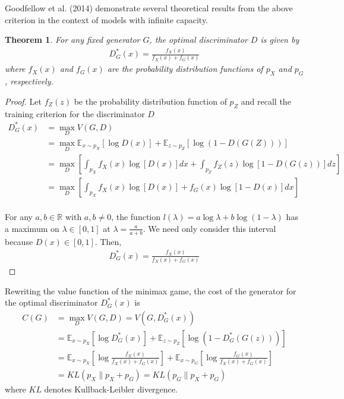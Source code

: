 \documentclass[submission]{eptcs}
\newcommand{\R}{\mathbb R}
\newtheorem{theorem}{Theorem}
\begin{document}
\noindent Goodfellow et al. (2014) demonstrate several theoretical results from the above criterion in the context of models with infinite capacity. \\

\begin{theorem}
    For any fixed generator $G$, the optimal discriminator $D$ is given by
    \begin{align}
        D^*_G(x) = \frac{f_X(x)}{f_X(x) + f_G(x)}
    \end{align}
    where $f_X(x)$ and $f_G(x)$ are the probability distribution functions of $p_X$ and $p_G$, respectively.
\end{theorem}
\begin{proof}
    Let $f_Z(z)$ be the probability distribution function of $p_Z$ and recall the training criterion for the discriminator $D$
    \begin{align*}
        D^*_G(x) &= \max_D V(G, D) \\
        &= \max_D \mathbb{E}_{x \sim p_X} [\log D(x)] + \mathbb{E}_{z \sim p_Z} [\log(1 - D(G(Z)))] \\
        &= \max_D \left [ \int_{p_X} f_X(x) \log [D(x)] dx + \int_{p_Z} f_Z(z) \log [1-D(G(z))]dz \right ] \\
        &= \max_D \left [ \int_{p_X} f_X(x) \log [D(x)] + f_G(x) \log [1-D(x)] dx \right ] \\
    \end{align*}

    \noindent For any $a, b \in \R$ with $a, b \neq 0$, the function $l(\lambda) = a \log \lambda + b \log (1 - \lambda)$ has a maximum on $\lambda \in [0, 1]$ at $\lambda = \frac{a}{a+b}$. We need only consider this interval because $D(x) \in [0, 1]$. Then, 
    \begin{align*}
        D^*_G(x) = \frac{f_X(x)}{f_X(x) + f_G(x)}
    \end{align*}    
\end{proof}

\noindent Rewriting the value function of the minimax game, the cost of the generator for the optimal discriminator $D^*_G(x)$ is
\begin{align*}
    C(G) &= \max_D V(G, D) = V(G, D^*_G(x)) \\
    &= \mathbb{E}_{x \sim p_X} [\log D^*_G(x)] + \mathbb{E}_{z \sim p_Z} [\log(1 - D^*_G(G(z)))] \\
    &= \mathbb{E}_{x \sim p_X} \left [\log \frac{f_X(x)}{f_X(x) + f_G(x)} \right ] + \mathbb{E}_{x \sim p_G} \left [ \log \frac{f_G(x)}{f_X(x) + f_G(x)} \right ] \\
    &= KL (p_X \| p_X + p_G) = KL (p_G \| p_X + p_G)
\end{align*}
where $KL$ denotes Kullback-Leibler divergence. \\
\end{document}
